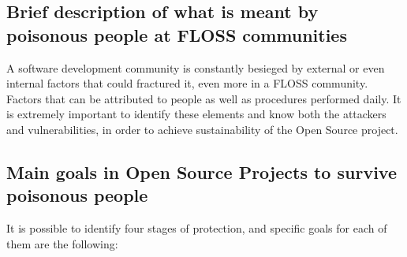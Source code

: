 \documentclass[11pt]{article} %
\begin{document}
\subsection{Brief description of what is meant by poisonous people at FLOSS communities}

A software development community is constantly besieged by external or even internal factors that could fractured it, even more in a FLOSS community. Factors that can be attributed to people as well as procedures performed daily. It is extremely important to identify these elements and know both the attackers and vulnerabilities, in order to achieve sustainability of the Open Source project.

\subsection{Main goals in Open Source Projects to survive poisonous people}

It is possible to identify four stages of protection, and specific goals for each of them are the following:
\end{document}

